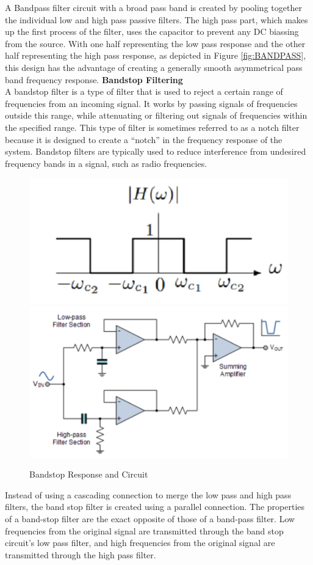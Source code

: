 \documentclass[12pt,a4paper]{article}
\begin{document}
				A Bandpass filter circuit with a broad pass band is created by pooling together the individual low and high pass passive filters. The high pass part, which makes up the first process of the filter, uses the capacitor to prevent any DC biassing from the source. With one half representing the low pass response and the other half representing the high pass response, as depicted in Figure \ref{fig:BANDPASS}, this design has the advantage of creating a generally smooth asymmetrical pass band frequency response.
\newpage
\vspace*{5mm}
			\textbf{Bandstop Filtering}\\
				A bandstop filter is a type of filter that is used to reject a certain range of frequencies from an incoming signal. It works by passing signals of frequencies outside this range,
				while attenuating or filtering out signals of frequencies within the specified range. This type of filter is sometimes referred to as a notch filter because it is designed to create
				a “notch” in the frequency response of the system. Bandstop filters are typically used to reduce interference from undesired frequency bands in a signal, such as radio frequencies.
				\begin{figure}[h]
					\begin{center}
						\includegraphics[width=0.6\linewidth]{Bandstop}
						\includegraphics[width=0.6\linewidth]{Bandstop_circuit}
					\end{center}
					\caption{Bandstop Response and Circuit}
				\end{figure}
				Instead of using a cascading connection to merge the low pass and high pass filters, the band stop filter is created using a parallel connection. The properties of a band-stop filter are the exact opposite of those of a band-pass filter. Low frequencies from the original signal are transmitted through the band stop circuit's low pass filter, and high frequencies from the original signal are transmitted through the high pass filter.\\	
\end{document}
